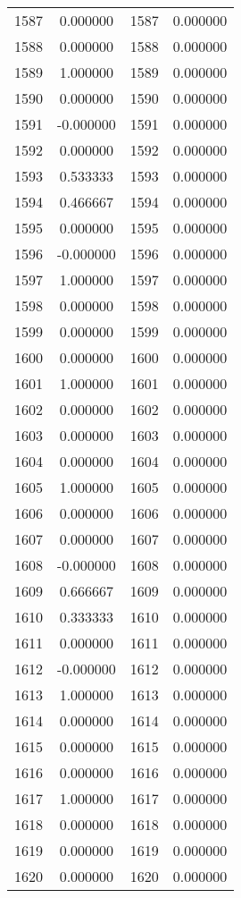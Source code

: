 \documentclass[12pt]{article}
\begin{document}
\begin{longtable}{@{}cccc@{}}
1587 & 0.000000 & 1587 & 0.000000 \\
1588 & 0.000000 & 1588 & 0.000000 \\
1589 & 1.000000 & 1589 & 0.000000 \\
1590 & 0.000000 & 1590 & 0.000000 \\
1591 & -0.000000 & 1591 & 0.000000 \\
1592 & 0.000000 & 1592 & 0.000000 \\
1593 & 0.533333 & 1593 & 0.000000 \\
1594 & 0.466667 & 1594 & 0.000000 \\
1595 & 0.000000 & 1595 & 0.000000 \\
1596 & -0.000000 & 1596 & 0.000000 \\
1597 & 1.000000 & 1597 & 0.000000 \\
1598 & 0.000000 & 1598 & 0.000000 \\
1599 & 0.000000 & 1599 & 0.000000 \\
1600 & 0.000000 & 1600 & 0.000000 \\
1601 & 1.000000 & 1601 & 0.000000 \\
1602 & 0.000000 & 1602 & 0.000000 \\
1603 & 0.000000 & 1603 & 0.000000 \\
1604 & 0.000000 & 1604 & 0.000000 \\
1605 & 1.000000 & 1605 & 0.000000 \\
1606 & 0.000000 & 1606 & 0.000000 \\
1607 & 0.000000 & 1607 & 0.000000 \\
1608 & -0.000000 & 1608 & 0.000000 \\
1609 & 0.666667 & 1609 & 0.000000 \\
1610 & 0.333333 & 1610 & 0.000000 \\
1611 & 0.000000 & 1611 & 0.000000 \\
1612 & -0.000000 & 1612 & 0.000000 \\
1613 & 1.000000 & 1613 & 0.000000 \\
1614 & 0.000000 & 1614 & 0.000000 \\
1615 & 0.000000 & 1615 & 0.000000 \\
1616 & 0.000000 & 1616 & 0.000000 \\
1617 & 1.000000 & 1617 & 0.000000 \\
1618 & 0.000000 & 1618 & 0.000000 \\
1619 & 0.000000 & 1619 & 0.000000 \\
1620 & 0.000000 & 1620 & 0.000000 \\

\end{longtable}
\end{document}

